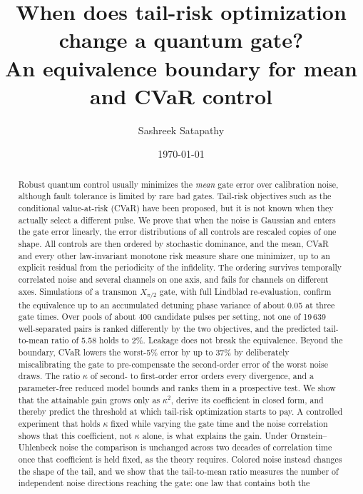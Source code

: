 \documentclass[aps,pra,twocolumn,superscriptaddress,reprint,nofootinbib,floatfix]{revtex4-2}
\theoremstyle{definition}
\begin{document}
\title{When does tail-risk optimization change a quantum gate?\\
An equivalence boundary for mean and CVaR control}

\author{Sashreek Satapathy}

\date{\today}

\begin{abstract}
Robust quantum control usually minimizes the \emph{mean} gate error over
calibration noise, although fault tolerance is limited by rare bad gates.
Tail-risk objectives such as the conditional value-at-risk (CVaR) have been
proposed, but it is not known when they actually select a different pulse.
We prove that when the noise is Gaussian and enters the gate error linearly,
the error distributions of all controls are rescaled copies of one shape. All
controls are then ordered by stochastic dominance, and the mean, CVaR and
every other law-invariant monotone risk measure share one minimizer, up to an
explicit residual from the periodicity of the infidelity. The ordering
survives temporally correlated noise and several channels on one axis, and
fails for channels on different axes. Simulations of a transmon
$X_{\pi/2}$ gate, with full Lindblad re-evaluation, confirm the equivalence up
to an accumulated detuning phase variance of about 0.05 at three gate times.
Over pools of about 400 candidate pulses per setting, not one of 19\,639
well-separated pairs is ranked differently by the two objectives, and the
predicted tail-to-mean ratio of 5.58 holds to 2\%. Leakage does not break
the equivalence. Beyond the boundary, CVaR lowers the worst-5\% error by up to
37\% by deliberately miscalibrating the gate to pre-compensate the
second-order error of the worst noise draws. The ratio $\kappa$ of second- to
first-order error orders every divergence, and a parameter-free reduced model
bounds and ranks them in a prospective test. We show that the attainable gain
grows only as $\kappa^2$, derive its coefficient in closed form, and thereby
predict the threshold at which tail-risk optimization starts to pay. A
controlled experiment that holds $\kappa$ fixed while varying the gate time
and the noise correlation shows that this coefficient, not $\kappa$ alone, is
what explains the gain. Under Ornstein--Uhlenbeck noise the comparison is
unchanged across two decades of correlation time once that coefficient is held
fixed, as the theory requires. Colored noise instead changes the shape of the
tail, and we show that the tail-to-mean ratio measures the number of
independent noise directions reaching the gate: one law that contains both the

\end{abstract}
\end{document}
